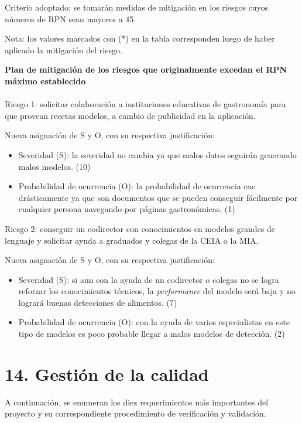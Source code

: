 \documentclass[
11pt, %
]{charter}
\begin{document}
Criterio adoptado: se tomarán medidas de mitigación en los riesgos cuyos números de RPN
sean mayores a 45.

Nota: los valores marcados con (*) en la tabla corresponden luego de haber aplicado la
mitigación del riesgo.


\textbf{Plan de mitigación de los riesgos que originalmente excedan el RPN máximo establecido}\\\\
Riesgo 1: solicitar colaboración a instituciones educativas de gastronomía para que provean recetas modelos, a cambio de publicidad en la aplicación.

Nueva asignación de S y O, con su respectiva justificación:
\begin{itemize}
\item Severidad (S): la severidad no cambia ya que malos datos seguirán generando malos modelos. (10)
\item Probabilidad de ocurrencia (O): la probabilidad de ocurrencia cae drásticamente ya que son documentos que se pueden conseguir fácilmente por cualquier persona navegando por páginas gastronómicas. (1)
\end{itemize}

Riesgo 2: conseguir un codirector con conocimientos en modelos grandes de lenguaje y solicitar ayuda a graduados y colegas de la CEIA o la MIA.

Nueva asignación de S y O, con su respectiva justificación:
\begin{itemize}
\item Severidad (S):  si aun con la ayuda de un codirector o colegas no se logra reforzar los conocimientos técnicos, la \textit{performance} del modelo será baja y no logrará buenas detecciones de alimentos. (7)
\item Probabilidad de ocurrencia (O): con la ayuda de varios especialistas en este tipo de modelos es poco probable llegar a malos modelos de detección. (2)
\end{itemize}


\section{14. Gestión de la calidad}
\label{sec:calidad}


A continuación, se enumeran los diez requerimientos más importantes del proyecto y su correspondiente procedimiento de verificación y validación. 
\end{document}
